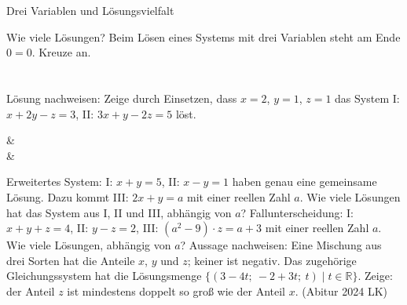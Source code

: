 \setcounter{aufgabe}{28}

\begin{aufgabe}{Drei Variablen und Lösungsvielfalt}
\begin{teile}
\teil Wie viele Lösungen? Beim Lösen eines Systems mit drei Variablen steht am Ende $0 = 0$. Kreuze an.\\ \\ \\ 
\teil Lösung nachweisen: Zeige durch Einsetzen, dass $x = 2$, $y = 1$, $z = 1$ das System I: $x + 2y - z = 3$, II: $3x + y - 2z = 5$ löst.
\end{teile}
\begin{gleichungsraster}[2]
 &
 \\
 &
 \\
\end{gleichungsraster}
\begin{teile}
\teil Erweitertes System: I: $x + y = 5$, II: $x - y = 1$ haben genau eine gemeinsame Lösung. Dazu kommt III: $2x + y = a$ mit einer reellen Zahl $a$. Wie viele Lösungen hat das System aus I, II und III, abhängig von $a$?
\teil Fallunterscheidung: I: $x + y + z = 4$, II: $y - z = 2$, III: $(a^2 - 9) \cdot z = a + 3$ mit einer reellen Zahl $a$. Wie viele Lösungen, abhängig von $a$?
\teil Aussage nachweisen: Eine Mischung aus drei Sorten hat die Anteile $x$, $y$ und $z$; keiner ist negativ. Das zugehörige Gleichungssystem hat die Lösungsmenge $\{(3 - 4t;\ -2 + 3t;\ t) \mid t \in \mathbb{R}\}$. Zeige: der Anteil $z$ ist mindestens doppelt so groß wie der Anteil $x$. \hfill (Abitur 2024 LK)
\end{teile}
\end{aufgabe}

